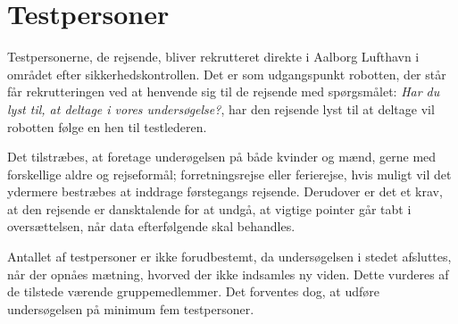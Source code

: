 \section{Testpersoner}
\label{ParametreTestpersoner}
%
Testpersonerne, de rejsende, bliver rekrutteret direkte i Aalborg Lufthavn i området efter sikkerhedskontrollen. Det er som udgangspunkt robotten, der står får rekrutteringen ved at henvende sig til de rejsende med spørgsmålet: \textit{Har du lyst til, at deltage i vores undersøgelse?}, har den rejsende lyst til at deltage vil robotten følge en hen til testlederen. 

Det tilstræbes, at foretage underøgelsen på både kvinder og mænd, gerne med forskellige aldre og rejseformål; forretningsrejse eller ferierejse, hvis muligt vil det ydermere bestræbes at inddrage førstegangs rejsende. Derudover er det et krav, at den rejsende er dansktalende for at undgå, at vigtige pointer går tabt i oversættelsen, når data efterfølgende skal behandles. 

Antallet af testpersoner er ikke forudbestemt, da undersøgelsen i stedet afsluttes, når der opnåes mætning, hvorved der ikke indsamles ny viden. Dette vurderes af de tilstede værende gruppemedlemmer. Det forventes dog, at udføre undersøgelsen på minimum fem testpersoner.     